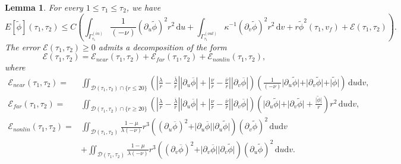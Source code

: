 \documentclass[10pt, reqno]{amsart}
\newtheorem{lemma}[theorem]{Lemma}
\theoremstyle{definition}
\theoremstyle{remark}
\theoremstyle{conjecture}
\numberwithin{equation}{section}
\newcommand{\abs}[1]{\vert#1\vert}
\newcommand{\set}[1]{\{#1\}}
\newcommand{\ud}{\mathrm{d}}
\newcommand{\rd}{\partial}
\newcommand{\0}{\emptyset}
\newcommand{\Gmm}{\Gamma}
\newcommand{\kpp}{\kappa}
\newcommand{\lmb}{\lambda}
\newcommand{\calD}{\mathcal D}
\newcommand{\calE}{\mathcal E}
\newcommand{\dur}{\nu}
\newcommand{\dvr}{\lmb}
\newcommand{\phibg}{\overline{\phi}}				%
\newcommand{\dvrbg}{\overline{\dvr}}				%
\newcommand{\durbg}{\overline{\dur}}				%
\newcommand{\rbg}{\overline{r}}					%
\newcommand{\phidf}{\widetilde{\phi}}				%
\newcommand{\Abs}[1]{\left\vert #1 \right\vert}
\begin{document}
\begin{lemma} \label{lem:en-ctrl}
For every $1 \leq \tau_{1} \leq \tau_{2}$, we have
\begin{equation} \label{eq:en-ctrl}
	E[\phidf](\tau_{1}, \tau_{2}) 
	\leq C \left( \int_{\Gmm^{(in)}_{\tau_{1}}} \frac{1}{(-\dur)} (\rd_{u} \phidf)^{2} r^{2} \, \ud u
	+ \int_{\Gmm^{(out)}_{\tau_{1}}} \kpp^{-1} (\rd_{v} \phidf)^{2} r^{2} \, \ud v + r \phidf^{2} (\tau_{1}, v_{f}) + \calE(\tau_{1}, \tau_{2}) \right).
\end{equation}
The error $\calE (\tau_{1}, \tau_{2}) \geq 0$ admits a decomposition of the form
\begin{equation*}
	\calE(\tau_{1}, \tau_{2}) = \calE_{near}(\tau_{1}, \tau_{2}) + \calE_{far}(\tau_{1}, \tau_{2}) + \calE_{nonlin}(\tau_{1}, \tau_{2}),
\end{equation*}
where
\begin{align*}
	\calE_{near}(\tau_{1}, \tau_{2})
	= & \iint_{\calD(\tau_{1}, \tau_{2}) \cap \set{r \leq 20}} 
		\left( \Abs{\frac{\dvr}{r} - \frac{\dvrbg}{\rbg}} \Abs{\rd_{u} \phibg} 
		+  \Abs{\frac{\dur}{r} - \frac{\durbg}{\rbg}} \Abs{\rd_{v} \phibg} \right) 
		\left( \frac{1}{(-\dur)} \abs{\rd_{u} \phidf} + \abs{\rd_{v} \phidf} + \abs{\phidf} \right)  \, \ud u \ud v, \\
%
	\calE_{far}(\tau_{1}, \tau_{2})
	= & \iint_{\calD(\tau_{1}, \tau_{2}) \cap \set{r \geq 20}} 
		\left( \Abs{\frac{\dvr}{r} - \frac{\dvrbg}{\rbg}} \Abs{\rd_{u} \phibg} 
		+  \Abs{\frac{\dur}{r} - \frac{\durbg}{\rbg}} \Abs{\rd_{v} \phibg} \right) 
		\left( \abs{\rd_{u} \phidf} + \abs{\rd_{v} \phidf} + \frac{\abs{\phidf}}{r}\right) r^{2} \, \ud u \ud v, \\
%
	\calE_{nonlin}(\tau_{1}, \tau_{2})
	= & \iint_{\calD(\tau_{1}, \tau_{2})} \frac{1-\mu}{\dvr (-\dur)}  r^{3} \left( (\rd_{u} \phibg)^{2} + \abs{\rd_{u} \phibg} \abs{\rd_{u} \phidf} \right) (\rd_{v} \phidf)^{2} \, \ud u \ud v \\
	& + \iint_{\calD(\tau_{1}, \tau_{2})} \frac{1-\mu}{\dvr (-\dur)}  r^{3} \left( (\rd_{v} \phibg)^{2} + \abs{\rd_{v} \phibg} \abs{\rd_{v} \phidf} \right)  (\rd_{u} \phidf)^{2} \, \ud u \ud v .
\end{align*}
\end{lemma}
\end{document}
